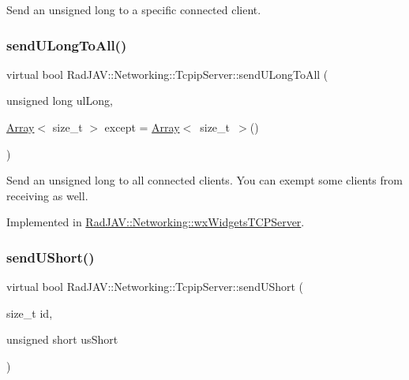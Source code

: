 Send an unsigned long to a specific connected client. \mbox{\label{class_rad_j_a_v_1_1_networking_1_1_tcpip_server_a3a7c5f60b92fd1cf44f7b2dcc95dd853}} 
\subsubsection{\texorpdfstring{send\+U\+Long\+To\+All()}{sendULongToAll()}}
{\footnotesize\ttfamily virtual bool Rad\+J\+A\+V\+::\+Networking\+::\+Tcpip\+Server\+::send\+U\+Long\+To\+All (\begin{DoxyParamCaption}\item[{unsigned long}]{ul\+Long,  }\item[{\mbox{\hyperlink{class_rad_j_a_v_1_1_array}{Array}}$<$ size\+\_\+t $>$}]{except = {\ttfamily \mbox{\hyperlink{class_rad_j_a_v_1_1_array}{Array}}$<$~size\+\_\+t~$>$()} }\end{DoxyParamCaption})\hspace{0.3cm}{\ttfamily [pure virtual]}}

Send an unsigned long to all connected clients. You can exempt some clients from receiving as well. 

Implemented in \mbox{\hyperlink{class_rad_j_a_v_1_1_networking_1_1wx_widgets_t_c_p_server_a07781e7fc1863045a08a2305ef26ff6c}{Rad\+J\+A\+V\+::\+Networking\+::wx\+Widgets\+T\+C\+P\+Server}}.

\mbox{\label{class_rad_j_a_v_1_1_networking_1_1_tcpip_server_a221f21ee42048f24ccc8d74a32f971ad}} 
\subsubsection{\texorpdfstring{send\+U\+Short()}{sendUShort()}}
{\footnotesize\ttfamily virtual bool Rad\+J\+A\+V\+::\+Networking\+::\+Tcpip\+Server\+::send\+U\+Short (\begin{DoxyParamCaption}\item[{size\+\_\+t}]{id,  }\item[{unsigned short}]{us\+Short }\end{DoxyParamCaption})\hspace{0.3cm}{\ttfamily [pure virtual]}}

